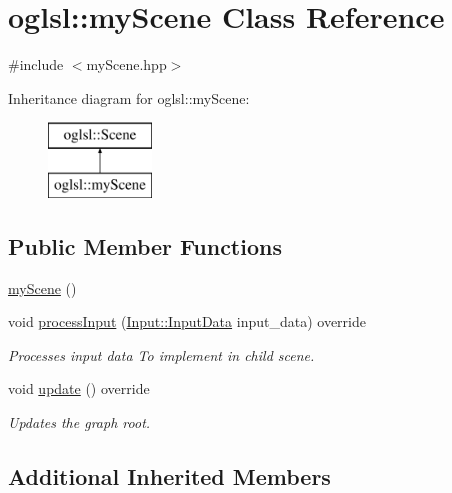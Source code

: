 \hypertarget{classoglsl_1_1my_scene}{}\section{oglsl\+:\+:my\+Scene Class Reference}
\label{classoglsl_1_1my_scene}


{\ttfamily \#include $<$my\+Scene.\+hpp$>$}

Inheritance diagram for oglsl\+:\+:my\+Scene\+:\begin{figure}[H]
\begin{center}
\leavevmode
\includegraphics[height=2.000000cm]{classoglsl_1_1my_scene}
\end{center}
\end{figure}
\subsection*{Public Member Functions}
\begin{DoxyCompactItemize}
\item 
\mbox{\hyperlink{classoglsl_1_1my_scene_a1ea16fb5ced9ac6f5fea4db7688d6076}{my\+Scene}} ()
\item 
void \mbox{\hyperlink{classoglsl_1_1my_scene_aeab1e8cfe8c40f6110e1789a74008191}{process\+Input}} (\mbox{\hyperlink{classoglsl_1_1_input_a3b21d7328538e661f366af5d6059c197}{Input\+::\+Input\+Data}} input\+\_\+data) override
\begin{DoxyCompactList}\small\item\em Processes input data To implement in child scene. \end{DoxyCompactList}\item 
void \mbox{\hyperlink{classoglsl_1_1my_scene_a798dcfe11aee5c093013c59b665b6754}{update}} () override
\begin{DoxyCompactList}\small\item\em Updates the graph root. \end{DoxyCompactList}\end{DoxyCompactItemize}
\subsection*{Additional Inherited Members}


